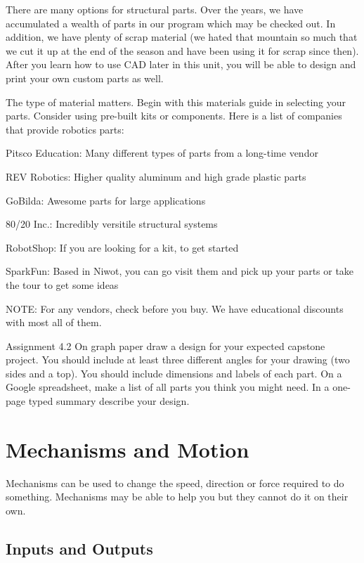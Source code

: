 \documentclass[
]{book}
\begin{document}
There are many options for structural parts. Over the years, we have accumulated a wealth of parts in our program which may be checked out. In addition, we have plenty of scrap material (we hated that mountain so much that we cut it up at the end of the season and have been using it for scrap since then). After you learn how to use CAD later in this unit, you will be able to design and print your own custom parts as well.

The type of material matters. Begin with this materials guide in selecting your parts. Consider using pre-built kits or components. Here is a list of companies that provide robotics parts:

Pitsco Education: Many different types of parts from a long-time vendor

REV Robotics: Higher quality aluminum and high grade plastic parts

GoBilda: Awesome parts for large applications

80/20 Inc.: Incredibly versitile structural systems

RobotShop: If you are looking for a kit, to get started

SparkFun: Based in Niwot, you can go visit them and pick up your parts or take the tour to get some ideas

NOTE: For any vendors, check before you buy. We have educational discounts with most all of them.

Assignment 4.2
On graph paper draw a design for your expected capstone project. You should include at least three different angles for your drawing (two sides and a top). You should include dimensions and labels of each part. On a Google spreadsheet, make a list of all parts you think you might need. In a one-page typed summary describe your design.

\hypertarget{mechanisms-and-motion}{%
\section{Mechanisms and Motion}\label{mechanisms-and-motion}}

Mechanisms can be used to change the speed, direction or force required to do something. Mechanisms may be able to help you but they cannot do it on their own.

\hypertarget{inputs-and-outputs}{%
\subsection{Inputs and Outputs}\label{inputs-and-outputs}}
\end{document}
